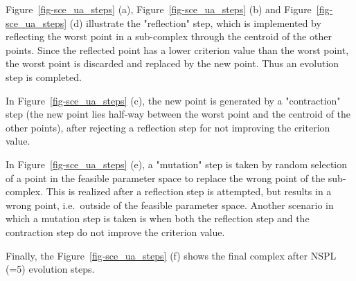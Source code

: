 \documentclass[
  letterpaper,
  DIV=11,
  numbers=noendperiod]{scrreprt}
\begin{document}
Figure~\ref{fig-sce_ua_steps} (a), Figure~\ref{fig-sce_ua_steps} (b) and
Figure~\ref{fig-sce_ua_steps} (d) illustrate the "reflection" step,
which is implemented by reflecting the worst point in a sub-complex
through the centroid of the other points. Since the reflected point has
a lower criterion value than the worst point, the worst point is
discarded and replaced by the new point. Thus an evolution step is
completed.

In Figure~\ref{fig-sce_ua_steps} (c), the new point is generated by a
"contraction" step (the new point lies half-way between the worst point
and the centroid of the other points), after rejecting a reflection step
for not improving the criterion value.

In Figure~\ref{fig-sce_ua_steps} (e), a "mutation" step is taken by
random selection of a point in the feasible parameter space to replace
the wrong point of the sub-complex. This is realized after a reflection
step is attempted, but results in a wrong point, i.e.~outside of the
feasible parameter space. Another scenario in which a mutation step is
taken is when both the reflection step and the contraction step do not
improve the criterion value.

Finally, the Figure~\ref{fig-sce_ua_steps} (f) shows the final complex
after NSPL (=5) evolution steps.
\end{document}
